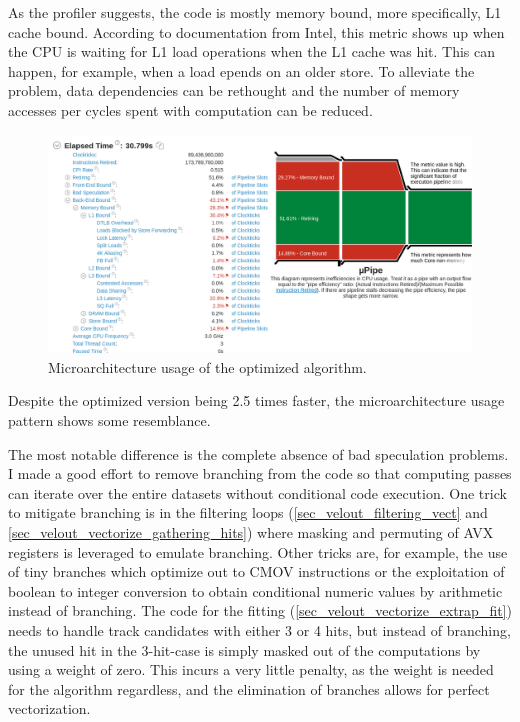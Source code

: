 \documentclass[12pt]{article}
\begin{document}
As the profiler suggests, the code is mostly memory bound, more specifically, L1 cache bound. According to documentation from Intel, this metric shows up when the CPU is waiting for L1 load operations when the L1 cache was hit. This can happen, for example, when a load epends on an older store. To alleviate the problem, data dependencies can be rethought and the number of memory accesses per cycles spent with computation can be reduced.\cite{intel_vtune_docs}

\begin{figure}[H]
	\begin{center}
		\includegraphics[width=\textwidth]{velout_uarch_overall_opt}
	\end{center}
	\caption{Microarchitecture usage of the optimized algorithm.}
	\label{fig_velout_uarch_overall_opt}
\end{figure}

Despite the optimized version being 2.5 times faster, the microarchitecture usage pattern shows some resemblance.

The most notable difference is the complete absence of bad speculation problems. I made a good effort to remove branching from the code so that computing passes can iterate over the entire datasets without conditional code execution. One trick to mitigate branching is in the filtering loops (\ref{sec_velout_filtering_vect} and \ref{sec_velout_vectorize_gathering_hits}) where masking and permuting of AVX registers is leveraged to emulate branching. Other tricks are, for example, the use of tiny branches which optimize out to CMOV instructions or the exploitation of boolean to integer conversion to obtain conditional numeric values by arithmetic instead of branching. The code for the fitting (\ref{sec_velout_vectorize_extrap_fit}) needs to handle track candidates with either 3 or 4 hits, but instead of branching, the unused hit in the 3-hit-case is simply masked out of the computations by using a weight of zero. This incurs a very little penalty, as the weight is needed for the algorithm regardless, and the elimination of branches allows for perfect vectorization.
\end{document}
